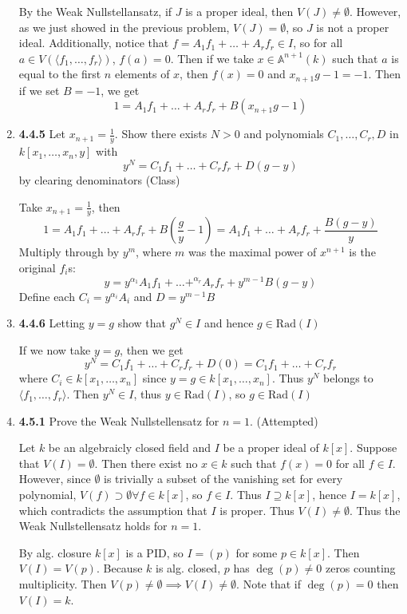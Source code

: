 \documentclass[12pt]{article}
\newcommand{\A}{\mathbb{A}}
\newcommand{\Rad}{\text{Rad}}
\begin{document}
\begin{enumerate}
 	By the Weak Nullstellansatz, if $J$ is a proper ideal, then $V(J)\neq \emptyset$.  However, as we just showed in the previous problem, $V(J)=\emptyset$, so $J$ is not a proper ideal.  Additionally, notice that $f=A_1f_1+\dots +A_rf_r \in I$, so for all $a\in V(\langle f_1,\dots,f_r\rangle)$, $f(a)=0$.  Then if we take $x\in \A^{n+1}(k)$ such that $a$ is equal to the first $n$ elements of $x$, then $f(x)=0$ and $x_{n+1}g-1=-1$.  Then if we set $B=-1$, we get 
 	 	\[1 = A_1f_1+\dots +A_rf_r + B(x_{n+1}g-1)\]

 	\item \textbf{4.4.5} Let $x_{n+1} = \frac{1}{y}$.  Show there exists $N>0$ and polynomials $C_1, \dots, C_r, D$ in $k[x_1,\dots,x_n,y]$ with
 	\[y^N=C_1f_1+\dots+C_rf_r+D(g-y)\]
 	by clearing denominators (Class)
 	
 	Take $x_{n+1} = \frac{1}{y}$, then 
 	\[1 = A_1f_1+\dots +A_rf_r + B(\frac{g}{y}-1) = A_1f_1+\dots +A_rf_r + \frac{B(g-y)}{y}\]
 	Multiply through by $y^m$, where $m$ was the maximal power of $x^{n+1}$ is the original $f_i$s:
 	\[y = y^{\alpha_1}A_1f_1+\dots +^{\alpha_r}A_rf_r + y^{m-1}B(g-y)\]
 	Define each $C_i = y^{\alpha_i}A_i$ and $D=y^{m-1}B$
 	
 	\item \textbf{4.4.6} Letting $y=g$ show that $g^N\in I$ and hence $g\in \Rad(I)$
 
 If we now take $y=g$, then we get
 \[y^N=C_1f_1+\dots+C_rf_r+D(0) =C_1f_1+\dots+C_rf_r\]
 where $C_i \in k[x_1,\dots, x_n]$ since $y =g\in k[x_1,\dots, x_n]$.  Thus $y^N$ belongs to $\langle f_1,\dots,f_r\rangle$.
 Then $y^N \in I$, thus $y\in \Rad(I)$, so $g\in \Rad(I)$
 	
 	\item \textbf{4.5.1} Prove the Weak Nullstellensatz for $n=1$. (Attempted)
 	
 	Let $k$ be an algebraicly closed field and $I$ be a proper ideal of $k[x]$.  Suppose that $V(I)=\emptyset$.  Then there exist no $x\in k$ such that $f(x)=0$ for all $f\in I$.  However, since $\emptyset$ is trivially a subset of the vanishing set for every polynomial, $V(f) \supset \emptyset \forall f\in k[x]$, so $f\in I$.  Thus $I\supseteq k[x]$, hence $I=k[x]$, which contradicts the assumption that $I$ is proper.  Thus $V(I)\neq \emptyset$.  Thus the Weak Nullstellensatz holds for $n=1$.
 	
 	By alg. closure $k[x]$ is a PID, so $I=(p)$ for some $p\in k[x]$.  Then $V(I)=V(p)$.  Because $k$ is alg. closed, $p$ has $\deg(p) \neq 0$ zeros counting multiplicity.  Then $V(p) \neq \emptyset \implies V(I)\neq \emptyset$.  Note that if $\deg(p)=0$ then $V(I)=k$.
 	

\end{enumerate}
\end{document}
